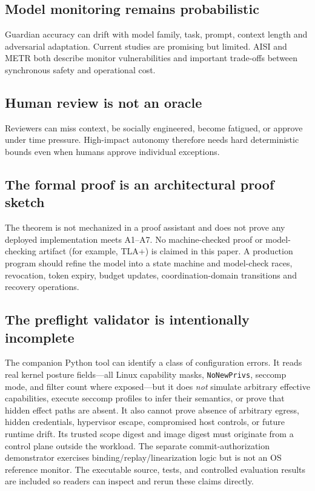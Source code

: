 \documentclass[11pt,letterpaper]{article}
\newcommand{\code}[1]{\texttt{#1}}
\begin{document}
\subsection{Model monitoring remains probabilistic}
Guardian accuracy can drift with model family, task, prompt, context length and adversarial adaptation. Current studies are promising but limited. AISI and METR both describe monitor vulnerabilities and important trade-offs between synchronous safety and operational cost.\cite{metr-monitor,aisi-monitoring,aisi-redteam,aisi-async}

\subsection{Human review is not an oracle}
Reviewers can miss context, be socially engineered, become fatigued, or approve under time pressure. High-impact autonomy therefore needs hard deterministic bounds even when humans approve individual exceptions.

\subsection{The formal proof is an architectural proof sketch}
The theorem is not mechanized in a proof assistant and does not prove any deployed implementation meets A1--A7. No machine-checked proof or model-checking artifact (for example, TLA+) is claimed in this paper. A production program should refine the model into a state machine and model-check races, revocation, token expiry, budget updates, coordination-domain transitions and recovery operations.

\subsection{The preflight validator is intentionally incomplete}
The companion Python tool can identify a class of configuration errors. It reads real kernel posture fields---all Linux capability masks, \code{NoNewPrivs}, seccomp mode, and filter count where exposed---but it does \emph{not} simulate arbitrary effective capabilities, execute seccomp profiles to infer their semantics, or prove that hidden effect paths are absent. It also cannot prove absence of arbitrary egress, hidden credentials, hypervisor escape, compromised host controls, or future runtime drift. Its trusted scope digest and image digest must originate from a control plane outside the workload. The separate commit-authorization demonstrator exercises binding/replay/linearization logic but is not an OS reference monitor. The executable source, tests, and controlled evaluation results are included so readers can inspect and rerun these claims directly.
\end{document}
